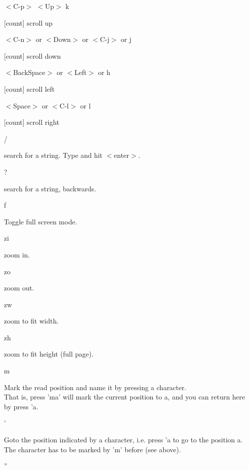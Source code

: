 \documentclass[a4paper,12pt]{article}
\newcommand{\apvlv}{\textsf{Apvlv{ }}}
\begin{document}
\begin{description}
\item $<$C-p$>$
$<$Up$>$
k

[count] scroll up
\item  $<$C-n$>$ or 
 $<$Down$>$ or 
 $<$C-j$>$ or 
 j

[count] scroll down

\item $<$BackSpace$>$ or 
$<$Left$>$ or 
h

[count] scroll left

\item $<$Space$>$ or 
$<$C-l$>$ or 
l

[count] scroll right

\item /

search for a string. Type and hit $<$enter$>$.

\item ?

search for a string, backwards.

\item f

Toggle full screen mode. %

\item zi

zoom in.

\item zo

zoom out.

\item zw

zoom to fit width.

\item zh

zoom to fit height (full page).

\item m

Mark the read position and name it by pressing a character. \\
That is, press 'ma' will mark the current position to a, and you can return here by press 'a.

\item '

Goto the position indicated by a character, i.e. press 'a to go to the position a. \\
The character has to be marked by 'm' before (see above).

\item ''


\end{description}
\end{document}
